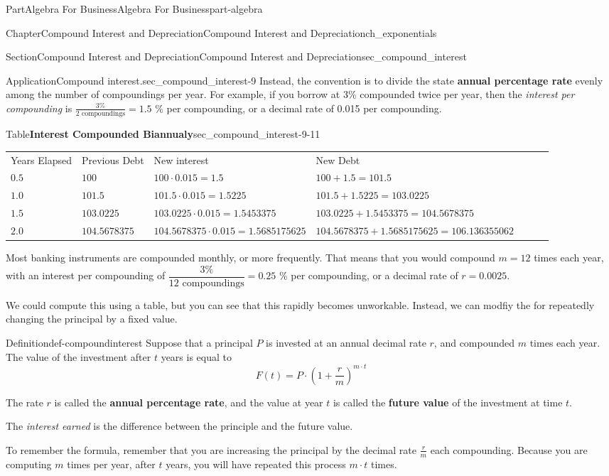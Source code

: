 \documentclass[oneside,10pt,]{tufte-book}
\newcommand{\tabularfont}{\relax}
\newcommand{\terminology}[1]{\textbf{#1}}
\numberwithin{equation}{chapter}
\newcommand{\hrulethin}  {\noalign{\hrule height 0.04em}}
\begin{document}
\begin{partptx}{Part}{Algebra For Business}{}{Algebra For Business}{}{}{part-algebra}
\begin{chapterptx}{Chapter}{Compound Interest and Depreciation}{}{Compound Interest and Depreciation}{}{}{ch_exponentials}
\begin{sectionptx}{Section}{Compound Interest and Depreciation}{}{Compound Interest and Depreciation}{}{}{sec_compound_interest}
\begin{insight}{Application}{Compound interest.}{sec_compound_interest-9}
Instead, the convention is to divide the state \terminology{annual percentage rate} evenly among the number of compoundings per year.  For example, if you borrow at 3\% compounded twice per year, then the \emph{interest per compounding} is \(\frac{3 \%}{2\text{ compoundings}} = 1.5\) \% per compounding, or a decimal rate of 0.015 per compounding.%
\begin{tableptx}{Table}{\textbf{Interest Compounded Biannualy}}{sec_compound_interest-9-11}{}%
\centering%
{\tabularfont%
\begin{tabular}{lAlAlAl}
Years Elapsed&Previous Debt&New interest&New Debt\tabularnewline\hrulethin
\(0.5\)&\(100\)&\(100\cdot 0.015=1.5\)&\(100+1.5 = 101.5\)\tabularnewline\hrulethin
\(1.0\)&\(101.5\)&\(101.5\cdot 0.015=1.5225\)&\(101.5+1.5225=103.0225\)\tabularnewline\hrulethin
\(1.5\)&\(103.0225\)&\(103.0225\cdot 0.015=1.5453375 \)&\(103.0225+1.5453375=104.5678375\)\tabularnewline\hrulethin
\(2.0\)&\(104.5678375\)&\(104.5678375\cdot 0.015=1.5685175625\)&\(104.5678375+1.5685175625= 106.136355062 \)
\end{tabular}
}%
\end{tableptx}%
Most banking instruments are compounded monthly, or more frequently. That means that you would compound \(m=12\) times each year, with an interest per compounding of \(\dfrac{3\%}{12\text{ compoundings}}=0.25\) \% per compounding, or a decimal rate of \(r = 0.0025\).%
\par
We could compute this using a table, but you can see that this rapidly becomes unworkable.  Instead, we can modfiy the for repeatedly changing the principal by a fixed value.%
\end{insight}
\begin{definition}{Definition}{}{def-compoundinterest}%
Suppose that a principal \(P\) is invested at an annual decimal rate \(r\), and compounded \(m\) times each year.  The value of the investment after \(t\) years is equal to%
\begin{equation*}
F(t) = P \cdot \left(1 + \frac{r}{m}\right)^{m\cdot t}
\end{equation*}
%
\par
The rate \(r\) is called the \terminology{annual percentage rate}, and the value at year \(t\) is called the \terminology{future value} of the investment at time \(t\).%
\par
The \emph{interest earned} is the difference between the principle and the future value.%
\end{definition}
To remember the formula, remember that you are increasing the principal by the decimal rate \(\frac{r}{m}\) each compounding.  Because you are computing \(m\) times per year, after \(t\) years, you will have repeated this process \(m\cdot t\) times.%

\end{sectionptx}
\end{chapterptx}
\end{partptx}
\end{document}
